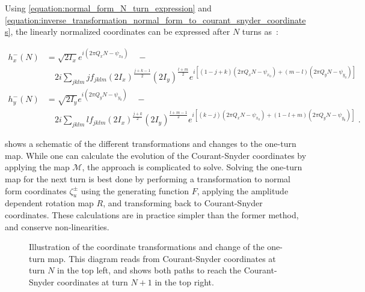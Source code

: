 Using \cref{equation:normal_form_N_turn_expression} and \cref{equation:inverse_transformation_normal_form_to_courant_snyder_coordinates}, the linearly normalized coordinates can be expressed after \(N\) turns as~\cite{CERN:Bartolini:Normal_Form_Tracking_Beam_Data}:

\begin{equation}
    \begin{aligned}
        h_x^{-}(N) & = \sqrt{2 I_x} e^{i \left( 2 \pi Q_x N - \psi_{x_0} \right)} \quad - \\
        & \quad 2 i \sum_{jklm} j f_{jklm} \left( 2 I_x \right)^{\frac{j+k-1}{2}} \left( 2 I_y \right)^{\frac{l+m}{2}}   e^{i \left[ (1-j+k) \left( 2 \pi Q_x N - \psi_{x_0} \right) + (m-l)   \left( 2 \pi Q_y N - \psi_{y_0} \right) \right]} \\
        h_y^{-}(N) & = \sqrt{2 I_y} e^{i \left( 2 \pi Q_y N - \psi_{y_0} \right)} \quad - \\
        & \quad 2 i \sum_{jklm} l f_{jklm} \left( 2 I_x \right)^{\frac{j+k}{2}}   \left( 2 I_y \right)^{\frac{l+m-1}{2}} e^{i \left[ (k-j)   \left( 2 \pi Q_x N - \psi_{x_0} \right) + (1-l+m) \left( 2 \pi Q_y N - \psi_{y_0} \right) \right]} \text{ .}
    \end{aligned}
    \label{equation:linearly_normalized_coordinates_after_N_turns}
\end{equation}

 shows a schematic of the different transformations and changes to the one-turn map.
While one can calculate the evolution of the Courant-Snyder coordinates by applying the map \( \mathcal{M} \), the approach is complicated to solve.
Solving the one-turn map for the next turn is best done by performing a transformation to normal form coordinates \(\zeta_{u}^{\pm}\) using the generating function \(F\), applying the amplitude dependent rotation map \(R\), and transforming back to Courant-Snyder coordinates.
These calculations are in practice simpler than the former method, and conserve non-linearities.

\begin{figure}[!htb]
    \centering
    \caption{Illustration of the coordinate transformations and change of the one-turn map. This diagram reads from Courant-Snyder coordinates at turn \(N\) in the top left, and shows both paths to reach the Courant-Snyder coordinates at turn \(N+1\) in the top right.}
    \label{figure:coordinate_transformations}
\end{figure}

